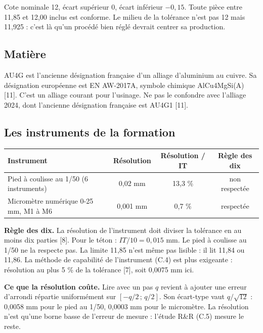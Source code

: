 \documentclass[11pt,a4paper]{article}
\newcommand{\diameter}{\varnothing}
\newcommand{\cote}{\diameter\,12^{\,0}_{-0{,}15}}
\begin{document}
\begin{retenir}[{Une cote $\cote$ se lit ainsi}]
Cote nominale 12, écart supérieur 0, écart inférieur $-0{,}15$. Toute pièce entre 11,85 et 12,00 inclus est conforme. Le milieu de la tolérance n'est pas 12 mais 11,925 : c'est là qu'un procédé bien réglé devrait centrer sa production.
\end{retenir}

\subsection{Matière}
AU4G est l'ancienne désignation française d'un alliage d'aluminium au cuivre. Sa désignation européenne est EN AW-2017A, symbole chimique AlCu4MgSi(A) [11]. C'est un alliage courant pour l'usinage. Ne pas le confondre avec l'alliage 2024, dont l'ancienne désignation française est AU4G1 [11].

\subsection{Les instruments de la formation}\label{sec:instr}
\begin{center}\small
\begin{tabular}{@{}lccc@{}}
\toprule
\textbf{Instrument} & \textbf{Résolution} & \textbf{Résolution / IT} & \textbf{Règle des dix}\\\midrule
Pied à coulisse au 1/50 (6 instruments) & 0,02 mm & 13,3 \% & non respectée\\
Micromètre numérique 0-25 mm, M1 à M6 & 0,001 mm & 0,7 \% & respectée\\\bottomrule
\end{tabular}
\end{center}

\textbf{Règle des dix.} La résolution de l'instrument doit diviser la tolérance en au moins dix parties [8]. Pour le téton : $IT/10 = 0{,}015$ mm. Le pied à coulisse au 1/50 ne la respecte pas. La limite 11,85 n'est même pas lisible : il lit 11,84 ou 11,86. La méthode de capabilité de l'instrument (C.4) est plus exigeante : résolution au plus 5 \% de la tolérance [7], soit 0,0075 mm ici.

\textbf{Ce que la résolution coûte.} Lire avec un pas $q$ revient à ajouter une erreur d'arrondi répartie uniformément sur $[-q/2\,;\,q/2]$. Son écart-type vaut $q/\sqrt{12}$ : 0,0058 mm pour le pied au 1/50, 0,0003 mm pour le micromètre. La résolution n'est qu'une borne basse de l'erreur de mesure : l'étude R\&R (C.5) mesure le reste.
\end{document}
